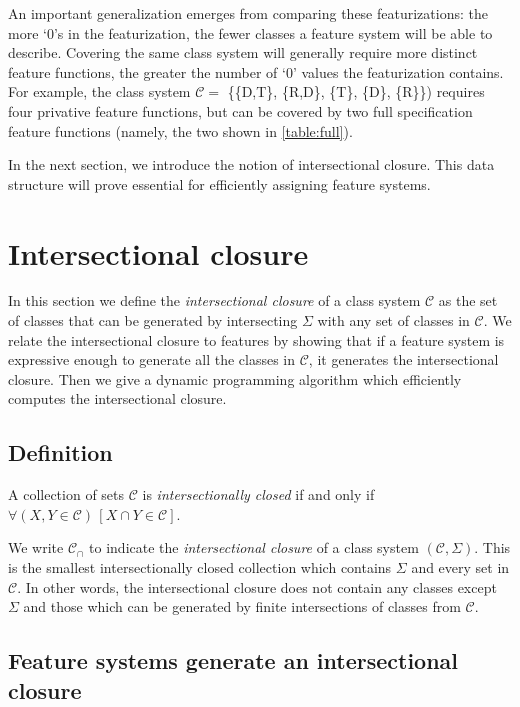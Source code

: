 \documentclass[11pt, oneside]{article}   	%
\begin{document}
\noindent An important generalization emerges from comparing these featurizations: the more `$0$'s in the featurization, the fewer classes a feature system will be able to describe. Covering the same class system will generally require more distinct feature functions, the greater the number of `$0$' values the featurization contains. For example, the class system $\mathcal{C} =$ \{\{D,T\}, \{R,D\}, \{T\}, \{D\}, \{R\}\}) requires four privative feature functions, but can be covered by two full specification feature functions (namely, the two shown in \ref{table:full}).

In the next section, we introduce the notion of intersectional closure. This data structure will prove essential for efficiently assigning feature systems.

\section{Intersectional closure}

In this section we define the \textit{intersectional closure} of a class system $\mathcal{C}$ as the set of classes that can be generated by intersecting $\Sigma$ with any set of classes in $\mathcal{C}$. We relate the intersectional closure to features by showing that if a feature system is expressive enough to generate all the classes in $\mathcal{C}$, it generates the intersectional closure. Then we give a dynamic programming algorithm which efficiently computes the intersectional closure. 

\subsection{Definition}

A collection of sets $\mathcal C$ is \textit{intersectionally closed} if and only if $\forall (X, Y \in \mathcal C) \, [ X \cap Y \in \mathcal C]$.

We write $\mathcal C_\cap$ to indicate the \textit{intersectional closure} of a class system $(\mathcal C, \Sigma)$. This is the smallest intersectionally closed collection which contains $\Sigma$ and every set in $\mathcal C$. In other words, the intersectional closure does not contain any classes except $\Sigma$ and those which can be generated by finite intersections of classes from $\mathcal C$.

\subsection{Feature systems generate an intersectional closure}
\end{document}
